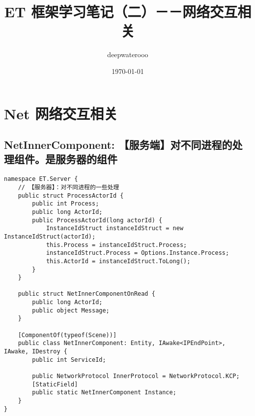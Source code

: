 \documentclass[9pt, b5paper]{article}
\author{deepwaterooo}
\date{\today}
\title{ET 框架学习笔记（二）－－网络交互相关}
\begin{document}
\maketitle
\tableofcontents


\section{Net 网络交互相关}
\label{sec:org9f34985}
\subsection{NetInnerComponent: 【服务端】对不同进程的处理组件。是服务器的组件}
\label{sec:orgd0beeac}
\begin{verbatim}
namespace ET.Server {
    // 【服务器】：对不同进程的一些处理
    public struct ProcessActorId {
        public int Process;
        public long ActorId;
        public ProcessActorId(long actorId) {
            InstanceIdStruct instanceIdStruct = new InstanceIdStruct(actorId);
            this.Process = instanceIdStruct.Process;
            instanceIdStruct.Process = Options.Instance.Process;
            this.ActorId = instanceIdStruct.ToLong();
        }
    }
    
    public struct NetInnerComponentOnRead {
        public long ActorId;
        public object Message;
    }
    
    [ComponentOf(typeof(Scene))]
    public class NetInnerComponent: Entity, IAwake<IPEndPoint>, IAwake, IDestroy {
        public int ServiceId;
        
        public NetworkProtocol InnerProtocol = NetworkProtocol.KCP;
        [StaticField]
        public static NetInnerComponent Instance;
    }
}
\end{verbatim}
\end{document}
